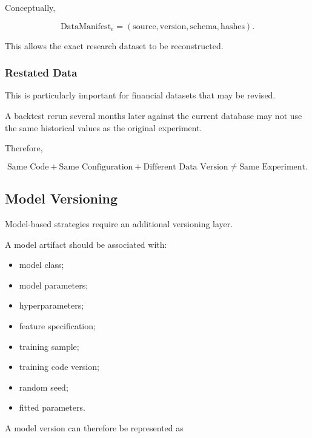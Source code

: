 \documentclass[11pt,a4paper]{article}
\begin{document}
Conceptually,

\begin{equation}
\boxed{
\mathrm{DataManifest}_e
=
\left(
\mathrm{source},
\mathrm{version},
\mathrm{schema},
\mathrm{hashes}
\right).
}
\end{equation}

This allows the exact research dataset to be reconstructed.


\subsubsection{Restated Data}

This is particularly important for financial datasets that may be revised.

A backtest rerun several months later against the current database may not use
the same historical values as the original experiment.

Therefore,

\begin{equation}
\boxed{
\text{Same Code}
+
\text{Same Configuration}
+
\text{Different Data Version}
\neq
\text{Same Experiment}.
}
\end{equation}


\subsection{Model Versioning}
\label{subsec:model_versioning}

Model-based strategies require an additional versioning layer.

A model artifact should be associated with:

\begin{itemize}
    \item model class;
    \item model parameters;
    \item hyperparameters;
    \item feature specification;
    \item training sample;
    \item training code version;
    \item random seed;
    \item fitted parameters.
\end{itemize}

A model version can therefore be represented as
\end{document}
